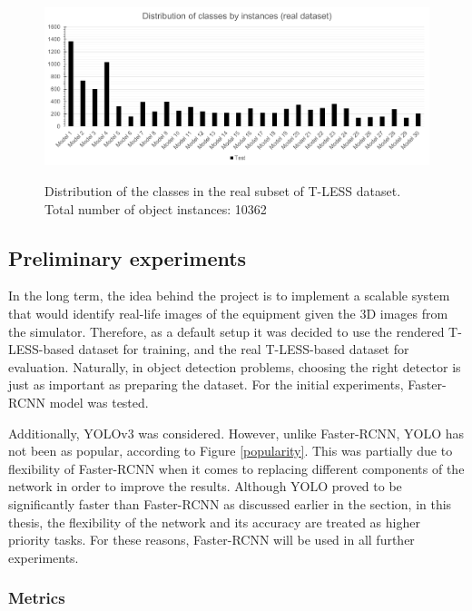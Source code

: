 \documentclass[english, 12pt, a4paper, elec, utf8, a-1b, online]{aaltothesis}
\begin{document}
\begin{figure}[htb]
	\begin{center}
		\includegraphics[width=14cm]{./real_distribution.png}
	\end{center}
	\caption{Distribution of the classes in the real subset of T-LESS dataset. Total number of object instances: 10362}
	\begin{center}
		\label{tless_distribution_real}
	\end{center}
\end{figure}
\FloatBarrier

\subsection{Preliminary experiments}
In the long term, the idea behind the project is to implement a scalable system that would identify real-life images of the equipment given the 3D images from the simulator. Therefore, as a default setup it was decided to use the rendered T-LESS-based dataset for training, and the real T-LESS-based dataset for evaluation. Naturally, in object detection problems, choosing the right detector is just as important as preparing the dataset. For the initial experiments, Faster-RCNN  \cite{Girshick2015} model was tested.

Additionally, YOLOv3 \cite{Redmon2018a} was considered. However, unlike Faster-RCNN, YOLO has not been as popular, according to Figure \ref{popularity}. This was partially due to flexibility of Faster-RCNN when it comes to replacing different components of the network in order to improve the results. Although YOLO proved to be significantly faster than Faster-RCNN as discussed earlier in the  section, in this thesis, the flexibility of the network and its accuracy are treated  as higher priority tasks. For these reasons, Faster-RCNN will be used in all further experiments.  
   

\subsubsection{Metrics}
\label{metrics_section} 
\end{document}
